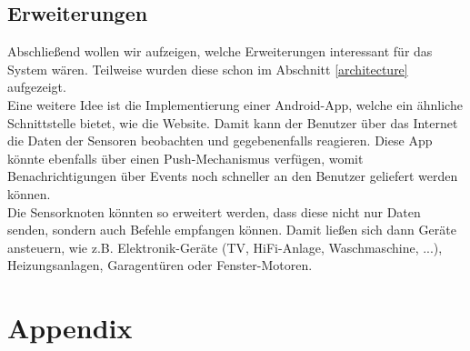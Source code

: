\documentclass[12pt,a4paper,twoside]{article}
\begin{document}
\subsection{Erweiterungen}
Abschließend wollen wir aufzeigen, welche Erweiterungen interessant für das System wären. Teilweise wurden diese schon im Abschnitt \ref{architecture} aufgezeigt. \\
Eine weitere Idee ist die Implementierung einer Android-App, welche ein ähnliche Schnittstelle bietet, wie die Website. Damit kann der Benutzer über das Internet die Daten der Sensoren beobachten und gegebenenfalls reagieren. Diese App könnte ebenfalls über einen Push-Mechanismus verfügen, womit Benachrichtigungen über Events noch schneller an den Benutzer geliefert werden können.\\
Die Sensorknoten könnten so erweitert werden, dass diese nicht nur Daten senden, sondern auch Befehle empfangen können. Damit ließen sich dann Geräte ansteuern, wie z.B. Elektronik-Geräte (TV, HiFi-Anlage, Waschmaschine, ...), Heizungsanlagen, Garagentüren oder Fenster-Motoren.
\clearpage

\section{Appendix}




\end{document}
